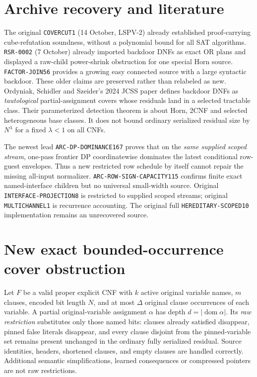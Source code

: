 \documentclass[11pt]{article}
\begin{document}
\section{Archive recovery and literature}
The original \texttt{COVERCUT1} (14 October, LSPV-2)
already established proof-carrying cube-refutation soundness,
without a polynomial bound for all SAT algorithms.
\texttt{RSR-0002} (7 October) already imported
backdoor DNFs as exact OR plans and displayed a raw-child
power-shrink obstruction for one special Horn source.
\texttt{FACTOR-JOIN56} provides a growing easy connected
source with a large syntactic backdoor. These older claims
are preserved rather than relabeled as new.
Ordyniak, Schidler and Szeider's 2024 JCSS paper defines
backdoor DNFs as \emph{tautological} partial-assignment
covers whose residuals land in a selected tractable class.
Their parameterized detection theorem is about Horn,
2CNF and selected heterogeneous base classes.
It does not bound ordinary serialized residual size by
$N^\lambda$ for a fixed $\lambda<1$ on all CNFs.

The newest lead \texttt{ARC-DP-DOMINANCE167} proves that on
the \emph{same supplied scoped stream}, one-pass frontier DP
coordinatewise dominates the latest conditional row-guest
envelopes. Thus a new restricted row schedule by itself
cannot repair the missing all-input normalizer.
\texttt{ARC-ROW-SIGN-CAPACITY115} confirms finite exact
named-interface children but no universal small-width
source. Original \texttt{INTERFACE-PROJECTION8} is
restricted to supplied scoped streams; original
\texttt{MULTICHANNEL1} is recurrence accounting.
The original full \texttt{HEREDITARY-SCOPED10}
implementation remains an unrecovered source.

\section{New exact bounded-occurrence cover obstruction}
Let $F$ be a valid proper explicit CNF with $k$ active
original variable names, $m$ clauses, encoded bit length
$N$, and at most $\Delta$ original clause occurrences of
each variable. A partial original-variable assignment
$\alpha$ has depth $d=|\operatorname{dom}\alpha|$.
Its \emph{raw restriction} substitutes only those named
bits: clauses already satisfied disappear, pinned false
literals disappear, and every clause disjoint from the
pinned-variable set remains present unchanged in the
ordinary fully serialized residual. Source identities,
headers, shortened clauses, and empty clauses are
handled correctly. Additional semantic simplifications,
learned consequences or compressed pointers are not
raw restrictions.
\end{document}
